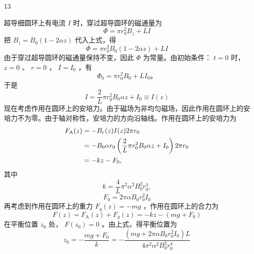 \begin{solution}{13}
\begin{subsolution}
超导细圆环上有电流 $I$ 时，穿过超导圆环的磁通量为
\begin{equation}
\Phi = \pi r _ {0} ^ {2} B _ {z} + L I
\label{eq:1.s13}
\end{equation}
把 $B_{z} = B_{0}(1 - 2\alpha z)$ 代入上式，得
\begin{equation}
\Phi = \pi r _ {0} ^ {2} B _ {0} (1 - 2 \alpha z) + L I
\label{eq:2.s13}
\end{equation}
由于穿过超导圆环的磁通量保持不变，因此 $\Phi$ 为常量。由初始条件： $t = 0$ 时， $z = 0$ 、 $r = 0$ ， $I = I_{0}$ ，有
\begin{equation}
\Phi_ {0} = \pi r _ {0} ^ {2} B _ {0} + L I _ {0}。
\label{eq:3.s13}
\end{equation}
于是
\begin{equation}
I = \frac {2}{L} \pi r _ {0} ^ {2} B _ {0} \alpha z + I _ {0} \equiv I (z)
\label{eq:4.s13}
\end{equation}
现在考虑作用在圆环上的安培力。由于磁场为非均匀磁场，因此作用在圆环上的安培力不为零。由于轴对称性，安培力的方向沿轴线。作用在圆环上的安培力为
\begin{align}
F _ {\mathrm{A}} (z) &= - B _ {r} (z) I (z) 2 \pi r _ {0} \notag \\
&= - B _ {0} \alpha r _ {0} \left(\frac {2}{L} \pi r _ {0} ^ {2} B _ {0} \alpha z + I _ {0}\right) 2 \pi r _ {0} \notag \\
&= - k z - F _ {0},
\label{eq:5.s13}
\end{align}
其中
\begin{equation}
k = \frac {4}{L} \pi^ {2} \alpha^ {2} B _ {0} ^ {2} r _ {0} ^ {4},
\label{eq:6.s13}
\end{equation}
\begin{equation*}
F _ {0} = 2 \pi \alpha B _ {0} r _ {0} ^ {2} I _ {0}
\end{equation*}
再考虑到作用在圆环上的重力 $F_{g}(z) = -mg$ ，作用在圆环上的合力为
\begin{equation}
F (z) = F _ {\mathrm{A}} (z) + F _ {g} (z) = - k z - \left(m g + F _ {0}\right)
\label{eq:7.s13}
\end{equation}
在平衡位置 $z_0$ 处， $F(z_0) = 0$ 。由上式，得平衡位置为
\begin{equation}
z _ {0} = - \frac {m g + F _ {0}}{k} = - \frac {(m g + 2 \pi \alpha B _ {0} r _ {0} ^ {2} I _ {0}) L}{4 \pi^ {2} \alpha^ {2} B _ {0} ^ {2} r _ {0} ^ {4}}
\label{eq:8.s13}
\end{equation}

\end{subsolution}
\end{solution}

